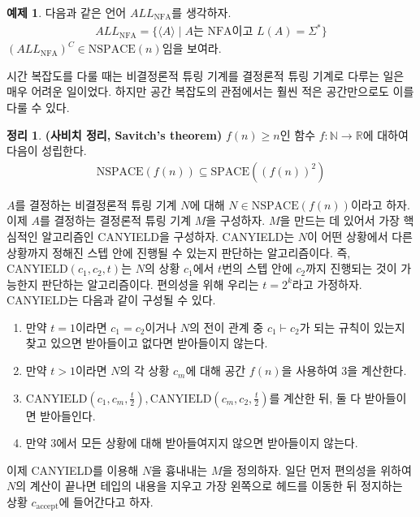\documentclass[b5paper, 10pt]{book}
\theoremstyle{definition}
\newtheorem{thm}[defn]{정리}
\newtheorem{ex}[defn]{예제}
\newenvironment{pf*}{\pushQED{\qed}\pf}{\popQED\endpf}
\begin{document}
\begin{ex}
    다음과 같은 언어 $ALL_\text{NFA}$를 생각하자.
    \begin{align*}
        ALL_{\text{NFA}} = \{ \langle A \rangle \;\vert\; 
        A \text{는 NFA이고 } L(A) = \Sigma^*\}
    \end{align*}
    $(ALL_{\text{NFA}})^C \in \text{NSPACE}(n)$임을 보여라.
\end{ex}
시간 복잡도를 다룰 때는 비결정론적 튜링 기계를 결정론적 튜링 기계로
다루는 일은 매우 어려운 일이었다. 하지만 공간 복잡도의 관점에서는 훨씬 적은 공간만으로도
이를 다룰 수 있다.
\begin{thm}
    \textbf{(사비치 정리, Savitch's theorem)}
    $f(n) \ge n$인 함수 $f: \mathbb{N} \rightarrow \mathbb{R}$에
    대하여 다음이 성립한다.
    \begin{align*}
        \text{NSPACE}(f(n)) \subseteq \text{SPACE}((f(n))^2)
    \end{align*}
\end{thm}
\begin{pf*}
    $A$를 결정하는 비결정론적 튜링 기계 $N$에 대해 $N \in \text{NSPACE}(f(n))$이라고
    하자. 이제 $A$를 결정하는 결정론적 튜링 기계 $M$을 구성하자. 
    $M$을 만드는 데 있어서 가장 핵심적인 알고리즘인 CANYIELD을 구성하자.
    CANYIELD는 $N$이 어떤 상황에서 다른 상황까지 정해진 스텝 안에 진행될 수
    있는지 판단하는 알고리즘이다. 즉, $\text{CANYIELD}(c_1, c_2, t)$는 $N$의
    상황 $c_1$에서 $t$번의 스텝 안에 $c_2$까지 진행되는 것이 가능한지 판단하는 알고리즘이다.
    편의성을 위해 우리는 $t = 2^k$라고 가정하자. CANYIELD는 다음과
    같이 구성될 수 있다.
    \begin{enumerate}
        \item 만약 $t = 1$이라면 $c_1 = c_2$이거나 $N$의 전이 관계 중
        $c_1 \vdash c_2$가 되는 규칙이 있는지 찾고 있으면 받아들이고 없다면
        받아들이지 않는다.
        \item 만약 $t > 1$이라면 $N$의 각 상황 $c_m$에 대해 공간 $f(n)$을 사용하여 3을 계산한다.
        \item $\text{CANYIELD}(c_1, c_m, \frac{t}{2}), \text{CANYIELD}(c_m, c_2, \frac{t}{2})$를
        계산한 뒤, 둘 다 받아들이면 받아들인다.
        \item 만약 3에서 모든 상황에 대해 받아들여지지 않으면 받아들이지 않는다.
    \end{enumerate}
    이제 CANYIELD를 이용해 $N$을 흉내내는 $M$을 정의하자. 일단 먼저 편의성을 위하여
    $N$의 계산이 끝나면 테입의 내용을 지우고 가장 왼쪽으로 헤드를 이동한 뒤 정지하는 
    상황 $c_\text{accept}$에 들어간다고 하자. 
\end{pf*}
\end{document}
